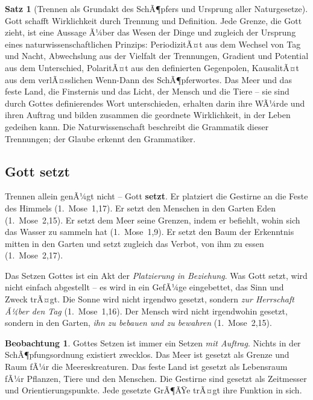 ﻿\documentclass[a4paper,12pt]{article}
\theoremstyle{definition}
\newtheorem{theorem}{Satz}[section]
\newtheorem{observation}{Beobachtung}[section]
\begin{document}
\begin{theorem}[Trennen als Grundakt des SchÃ¶pfers und Ursprung aller Naturgesetze]
	Gott schafft Wirklichkeit durch Trennung und Definition. Jede Grenze, die Gott
	zieht, ist eine Aussage Ã¼ber das Wesen der Dinge und zugleich der Ursprung eines
	naturwissenschaftlichen Prinzips: PeriodizitÃ¤t aus dem Wechsel von Tag und Nacht,
	Abwechslung aus der Vielfalt der Trennungen, Gradient und Potential aus dem
	Unterschied, PolaritÃ¤t aus den definierten Gegenpolen, KausalitÃ¤t aus dem
	verlÃ¤sslichen Wenn-Dann des SchÃ¶pferwortes. Das Meer und das feste Land,
	die Finsternis und das Licht, der Mensch und die Tiere -- sie sind durch Gottes
	definierendes Wort unterschieden, erhalten darin ihre WÃ¼rde und ihren Auftrag
	und bilden zusammen die geordnete Wirklichkeit, in der Leben gedeihen kann.
	Die Naturwissenschaft beschreibt die Grammatik dieser Trennungen; der Glaube
	erkennt den Grammatiker.
\end{theorem}

\subsection{Gott setzt}

Trennen allein genÃ¼gt nicht -- Gott \textbf{setzt}. Er platziert die Gestirne
an die Feste des Himmels (1.~Mose~1,17). Er setzt den Menschen in den Garten Eden
(1.~Mose~2,15). Er setzt dem Meer seine Grenzen, indem er befiehlt, wohin sich das
Wasser zu sammeln hat (1.~Mose~1,9). Er setzt den Baum der Erkenntnis mitten in
den Garten und setzt zugleich das Verbot, von ihm zu essen (1.~Mose~2,17).

Das Setzen Gottes ist ein Akt der \textit{Platzierung in Beziehung}. Was Gott
setzt, wird nicht einfach abgestellt -- es wird in ein GefÃ¼ge eingebettet, das
Sinn und Zweck trÃ¤gt. Die Sonne wird nicht irgendwo gesetzt, sondern \textit{zur
	Herrschaft Ã¼ber den Tag} (1.~Mose~1,16). Der Mensch wird nicht irgendwohin gesetzt,
sondern in den Garten, \textit{ihn zu bebauen und zu bewahren} (1.~Mose~2,15).

\begin{observation}
	Gottes Setzen ist immer ein Setzen \textit{mit Auftrag}. Nichts in der
	SchÃ¶pfungsordnung existiert zwecklos. Das Meer ist gesetzt als Grenze und
	Raum fÃ¼r die Meereskreaturen. Das feste Land ist gesetzt als Lebensraum fÃ¼r
	Pflanzen, Tiere und den Menschen. Die Gestirne sind gesetzt als Zeitmesser und
	Orientierungspunkte. Jede gesetzte GrÃ¶ÃŸe trÃ¤gt ihre Funktion in sich.
\end{observation}
\end{document}
